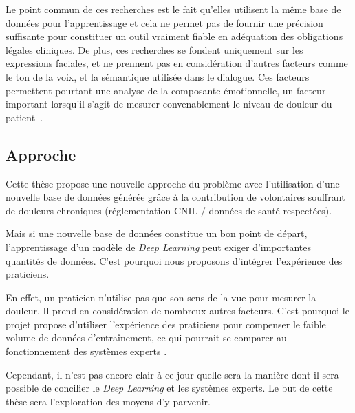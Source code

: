 \documentclass[11pt]{article}
\begin{document}
Le point commun de ces recherches est le fait qu’elles utilisent la même base de
données pour l’apprentissage et cela ne permet pas de fournir une précision
suffisante pour constituer un outil vraiment fiable en adéquation des
obligations légales cliniques. De plus, ces recherches se fondent uniquement sur
les expressions faciales, et ne prennent pas en considération d’autres facteurs
comme le ton de la voix, et la sémantique utilisée dans le dialogue. Ces
facteurs permettent pourtant une analyse de la composante émotionnelle, un facteur
important lorsqu’il s’agit de mesurer convenablement le niveau de douleur du
patient~\cite{hale1997emotional}.   


\subsection{Approche}
\label{sec:org97cce26}


Cette thèse propose une nouvelle approche du problème avec l’utilisation d’une
nouvelle base de données générée grâce à la contribution de volontaires
souffrant de douleurs chroniques (réglementation CNIL / données de santé
respectées).

Mais si une nouvelle base de données constitue un bon point de
départ, l’apprentissage d’un modèle de \emph{Deep Learning} peut exiger d’importantes
quantités de données. C’est pourquoi nous proposons d'intégrer l'expérience
des praticiens. 

En effet, un praticien n'utilise pas que son sens de la vue pour mesurer la
douleur. Il prend en considération de nombreux autres facteurs. C’est pourquoi
le projet propose d’utiliser l’expérience des praticiens pour compenser le
faible volume de données d’entraînement, ce qui pourrait se comparer au
fonctionnement des systèmes experts \cite{giarratano1998expert}. 

Cependant, il n’est pas encore clair à ce jour quelle sera la manière dont il
sera possible de concilier le \emph{Deep Learning} et les systèmes experts. Le but de
cette thèse sera l’exploration des moyens d’y parvenir. 
\end{document}
